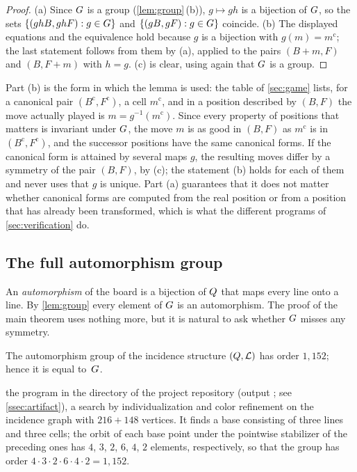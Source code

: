\begin{proof}
(a) Since $G$ is a group (\cref{lem:group}\,(b)), $g\mapsto gh$ is a bijection of $G$, so the sets
$\{(ghB,ghF):g\in G\}$ and $\{(gB,gF):g\in G\}$ coincide. (b) The displayed equations and the equivalence
hold because $g$ is a bijection with $g(m)=m^{\mathrm c}$; the last statement follows from them by (a),
applied to the pairs $(B+m,F)$ and $(B,F+m)$ with $h=g$. (c) is clear, using again that $G$ is a group.
\end{proof}

Part (b) is the form in which the lemma is used: the table of \cref{sec:game} lists, for a canonical
pair $(B^{\mathrm c},F^{\mathrm c})$, a cell $m^{\mathrm c}$, and in a position described by $(B,F)$ the
move actually played is $m=g^{-1}(m^{\mathrm c})$. Since every property of positions that matters is
invariant under $G$, the move $m$ is as good in $(B,F)$ as $m^{\mathrm c}$ is in
$(B^{\mathrm c},F^{\mathrm c})$, and the successor positions have the same canonical forms. If the
canonical form is attained by several maps $g$, the resulting moves differ by a symmetry of the pair
$(B,F)$, by (c); the statement (b) holds for each of them and never uses that $g$ is unique. Part (a)
guarantees that it does not matter whether canonical forms are computed from the real position or from a
position that has already been transformed, which is what the different programs of
\cref{sec:verification} do.

\subsection{The full automorphism group}\label{ssec:aut}

An \emph{automorphism} of the board is a bijection of $Q$ that maps every line onto a line. By
\cref{lem:group} every element of $G$ is an automorphism. The proof of the main theorem uses nothing
more, but it is natural to ask whether $G$ misses any symmetry.

\begin{fact}\label{fact:aut}
The automorphism group of the incidence structure $(Q,\mathcal{L})$ has order $1{,}152$; hence it is equal
to~$G$.

\established the program  in the directory  of the
project repository (output ; see \cref{ssec:artifact}), a
search by individualization and color refinement on the incidence graph with $216+148$ vertices. It
finds a base consisting of three lines and three cells; the orbit of each base point under the pointwise
stabilizer of the preceding ones has $4$, $3$, $2$, $6$, $4$, $2$ elements, respectively, so that the
group has order $4\cdot3\cdot2\cdot6\cdot4\cdot2=1{,}152$.
\end{fact}

